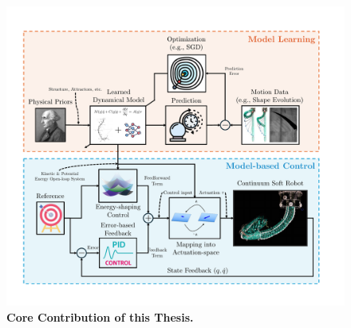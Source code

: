 \begin{figure}[ht]
    \centering
    \includegraphics[width=0.9\linewidth]{introduction/figures/model_based_control_with_learned_models_v3_cropped.pdf}
    \caption{\textbf{Core Contribution of this Thesis.} 
}
\end{figure}
